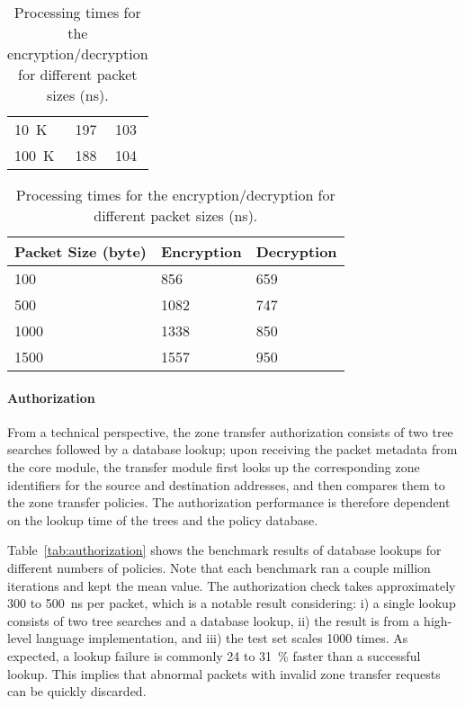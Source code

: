 \begin{table}[htb]
\begin{minipage}{.47\linewidth}
\begin{tabularx}{1\linewidth}{X|XX}
			\SI{10}{K}     & 197           & 103           \\	%
			\SI{100}{K}    & 188           & 104           \\	%
			\bottomrule
		\end{tabularx}
	\end{minipage}\hspace{2em}
	\begin{minipage}{.47\linewidth}
		\caption{Processing times for the encryption/decryption for different packet sizes (ns).}
		\label{tab:authentication}
		\begin{tabularx}{1\linewidth}{X|XX}
			\toprule
			Packet Size (byte) & Encryption & Decryption \\
			\midrule
			100                & 856        & 659        \\
			500                & 1082       & 747        \\
			1000               & 1338       & 850        \\
			1500               & 1557       & 950        \\
			\bottomrule
		\end{tabularx}
	\end{minipage}
\end{table}

\paragraph{Authorization}
From a technical perspective, the zone transfer authorization consists of two tree searches followed
by a database lookup;
upon receiving the packet metadata from the core module, the transfer module first looks
up the corresponding zone identifiers for the source and destination addresses, and then
compares them to the zone transfer policies. The authorization performance is therefore
dependent on the lookup time of the trees and the policy database.

Table~\ref{tab:authorization} shows
the benchmark results of database lookups for different numbers of policies.
Note that each benchmark ran a couple million iterations and kept the mean value.
The authorization check takes approximately 300 to \SI{500}{ns} per packet, which is a
notable result considering: i) a single lookup consists of two tree searches and a database lookup, ii) the result
is from a high-level language implementation, and iii) the test set scales 1000 times.
As expected, a lookup failure is commonly 24 to 31~\% faster than a successful lookup.
This implies that abnormal packets with invalid zone transfer requests can be quickly
discarded.


